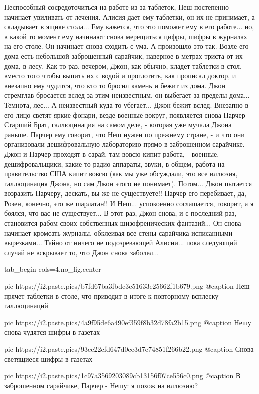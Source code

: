 Неспособный сосредоточиться на работе из-за таблеток, Неш постепенно начинает
увиливать от лечения. Алисия дает ему таблетки, он их не принимает, а
складывает в ящике стола... Ему кажется, что это поможет ему в его работе...
но, в какой то момент ему начинают снова мерещиться цифры, шифры в журналах на
его столе. Он начинает снова сходить с ума.  А произошло это так. Возле его
дома есть небольшой заброшенный сарайчик, наверное в метрах триста от их дома,
в лесу.  Как то раз, вечером, Джон, как обычно, кладет таблетки в стол, вместо
того чтобы выпить их с водой и проглотить, как прописал доктор, и внезапно ему
чудится, что кто то бросил камень и бежит из дома. Джон стремглав бросается
вслед за этим неизвестным, он выбегает за пределы дома... Темнота, лес... А
неизвестный куда то убегает... Джон бежит вслед. Внезапно в его лицо светят
яркие фонари, везде военные вокруг, появляется снова Парчер - Старший Брат,
галлюцинация на самом деле, - которая уже мучала Джона раньше. Парчер ему
говорит, что Неш нужен по прежнему стране, - и что они организовали
дешифровальную лабораторию прямо в заброшенном сарайчике. Джон и Парчер
проходят в сарай, там вовсю кипит работа, - военные, дешифровальщики, какие то
радио аппараты, звуки, в общем, работа на правительство США кипит вовсю (как мы
уже обсуждали, это все иллюзия, галлюцинация Джона, но сам Джон этого не
понимает). Потом... Джон пытается возразить Парчеру, дескать, вы же не
существуете!! Парчер его перебивает, да, Розен, конечно, это же шарлатан!! И
Неш... успокоенно соглашается, говорит, а я боялся, что вас не существует... В
этот раз, Джон снова, и с последний раз, становится рабом своих собственных
шизофренических фантазий... Он снова начинает кромсать журналы, обклеивая все
стены сарайчика исписанными вырезками... Тайно от ничего не подозревающей
Алисии... пока следующий случай не вскрывает то, что Джон снова заболел...

\ifcmt
  tab_begin cols=4,no_fig,center

		 pic https://i2.paste.pics/b7fd67ba3fbdc3c51633e25662f1b679.png
		 @caption Неш прячет таблетки в столе, что приводит в итоге к повторному всплеску галлюцинаций

		 pic https://i2.paste.pics/4a9f95de6a490ef359f8b32d78fa2b15.png
		 @caption Нешу снова чудятся шифры в газетах

     pic https://i2.paste.pics/93ec22cfd647d0ee3d7e74851f266b22.png
		 @caption Снова светящиеся шифры в газетах

		 pic https://i2.paste.pics/1c97a3569203089cb13156f07ce556c0.png
		 @caption В заброшенном сарайчике, Парчер - Нешу: я похож на иллюзию?

